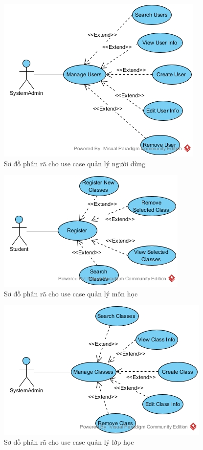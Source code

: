 \documentclass[12pt]{article}
\begin{document}
  \FloatBarrier
  \begin{figure}[ht]
    \centering
    \includegraphics[scale=0.5]{../pictures/projectdiagrams/Manage-Users-uc-destructing.jpg}
    \caption{Sơ đồ phân rã cho use case quản lý người dùng}
  \end{figure}
  \FloatBarrier

  \FloatBarrier
  \begin{figure}[ht]
    \centering
    \includegraphics[scale=0.5]{../pictures/projectdiagrams/Manage-Subjects-uc-destructing.jpg}
    \caption{Sơ đồ phân rã cho use case quản lý môn học}
  \end{figure}
  \FloatBarrier

  \FloatBarrier
  \begin{figure}[ht]
    \centering
    \includegraphics[scale=0.5]{../pictures/projectdiagrams/Manage-Classes-uc-destructing.jpg}
    \caption{Sơ đồ phân rã cho use case quản lý lớp học}
  \end{figure}
  \FloatBarrier
\end{document}
